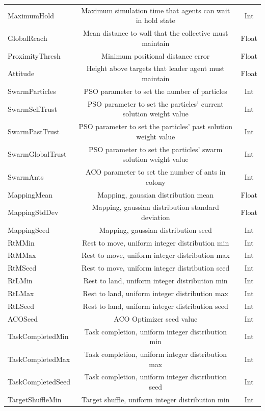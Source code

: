 \documentclass{report}
\begin{document}
\begin{table}[h]
\begin{center}
\begin{tabular}{|l|c|c|}
		MaximumHold  & Maximum simulation time that agents can wait in hold state & Int \\
		GlobalReach & Mean distance to wall that the collective must maintain & Float \\
		ProximityThresh & Minimum positional distance error & Float \\
		Attitude & Height above targets that leader agent must maintain & Float \\
		SwarmParticles & PSO parameter to set the number of particles & Int \\
		SwarmSelfTrust & PSO parameter to set the particles' current solution weight value & Int \\
		SwarmPastTrust & PSO parameter to set the particles' past solution weight value & Int \\
		SwarmGlobalTrust & PSO parameter to set the particles' swarm solution weight value & Int \\
		SwarmAnts & ACO parameter to set the number of ants in colony & Int \\
		MappingMean & Mapping, gaussian distribution mean & Float \\
		MappingStdDev & Mapping, gaussian distribution standard deviation & Float \\
		MappingSeed & Mapping, gaussian distribution seed & Int \\
		RtMMin & Rest to move, uniform integer distribution min & Int \\
		RtMMax & Rest to move, uniform integer distribution max & Int \\
		RtMSeed & Rest to move, uniform integer distribution seed & Int \\
		RtLMin & Rest to land, uniform integer distribution min & Int \\
		RtLMax & Rest to land, uniform integer distribution max & Int \\
		RtLSeed & Rest to land, uniform integer distribution seed & Int \\
		ACOSeed & ACO Optimizer seed value & Int \\
		TaskCompletedMin & Task completion, uniform integer distribution min & Int \\
		TaskCompletedMax & Task completion, uniform integer distribution max & Int \\
		TaskCompletedSeed & Task completion, uniform integer distribution seed & Int \\
		TargetShuffleMin & Target shuffle, uniform integer distribution min & Int \\

\end{tabular}
\end{center}
\end{table}
\end{document}
